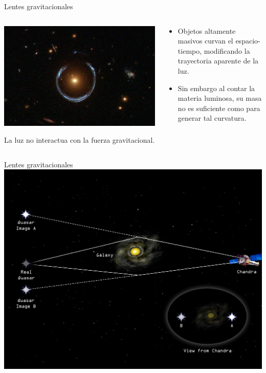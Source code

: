 \documentclass[handout]{beamer}
\begin{document}
\begin{frame}{Lentes gravitacionales}
	\begin{columns}
		\begin{column}{0.6\textwidth}
			\includegraphics[width=\linewidth]{sources/images/Einstein_Ring.jpg}
			
			La luz no interactua con la fuerza gravitacional.
		\end{column}
		\begin{column}{0.4\textwidth}
			\begin{itemize}
				\item Objetos altamente masivos curvan el espacio-tiempo, modificando la trayectoria aparente de la luz.
				\item Sin embargo al contar la materia luminosa, su masa no es suficiente como para generar tal curvatura.
			\end{itemize}
		\end{column}
	\end{columns}
	
\end{frame}

\begin{frame}{Lentes gravitacionales}
	\includegraphics[width = 0.7\linewidth]{sources/images/lens.jpg}
	
\end{frame}
\end{document}
